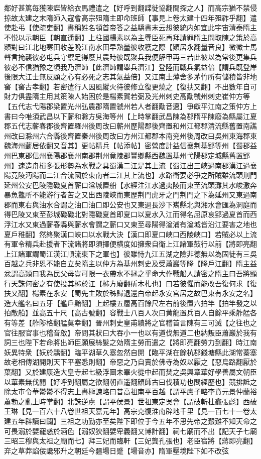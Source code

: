 鄰好甚篤每獲陳諜皆給衣馬禮遣之【好呼到翻諜徙協翻間探之人】而高宗猶不禁侵掠故太建之末隋師入寇會高宗殂隋主即命班師【事見上卷太建十四年殂祚乎翻】遣使赴弔【使疏吏翻】書稱姓名頓首帝答之益驕書末云想彼統内如宜此宇宙清泰隋主不悦以示朝臣【朝直遥翻】上柱國楊素以為主辱臣死再拜請罪隋主問取陳之策於高熲對曰江北地寒田收差晩江南水田早熟量彼收穫之際【熲居永翻量音良】微徵士馬聲言掩襲彼必屯兵守禦足得廢其農時彼既聚兵我便解甲再三若此彼以為常後更集兵彼必不信猶豫之頃我乃濟師【此濟師謂舉兵濟江】登陸而戰兵氣益倍【謂兵既登岸後限大江士無反顧之心有必死之志其氣益倍】又江南土薄舍多茅竹所有儲積皆非地窖【窖古孝翻】若密遣行人因風縱火待彼修立復更燒之【復扶又翻】不出數年自可財力俱盡隋主用其策陳人始困於是楊素賀若弼及光州刺史高勱虢州刺史崔仲方等【五代志弋陽郡梁置光州弘農郡隋置虢州若人者翻勱音邁】爭獻平江南之策仲方上書曰今唯須武昌以下蘄和滁方吳海等州【上時掌翻武昌陳為郡隋平陳廢為縣屬江夏郡五代志蘄春郡後齊置羅州後周改曰蘄州歷陽郡後齊置和州江都郡清流縣舊置南譙州改曰滁州六合縣後齊置秦州後周改曰方州江都郡本南兖州後周改曰吳州東海郡東魏海州蘄居依翻又音其】更帖精兵【帖添帖】密營度計益信襄荆基郢等州【蜀郡益州巴東郡信州襄陽郡襄州南郡荆州竟陵郡豐鄉縣西魏置基州弋陽郡定城縣舊置郢州】速造舟楫多張形勢為水戰之具蜀漢二江是其上流【蜀江出三峽過南郡漢江過襄陽竟陵沔陽而二江合流國於東南者二江其上流也】水路衝要必爭之所賊雖流頭荆門延州公安巴陵隱磯夏首蘄口湓城置船【水經注江水過夷陵而東至流頭灘其水峻激奔暴魚龞所不能游行者苦之又出西陵峽而東歷荆門虎牙之門荆門之下為延州又東過南郡而東右與油水合謂之油口油口即公安也又東過長沙下嶲縣北與湘水會匯為洞庭而得巴陵又東至彭城磯磯北對隱磯夏首即夏口以夏水入江而得名屈原哀郢過夏首而西浮江水又東過蘄春縣與蘄水會謂之蘄口又東至尋陽得湓浦有湓城皆沿江要害之地也夏戶稚翻】然終聚漢口峽口以水戰大決【漢口即夏口峽口西陵峽口】若賊必以上流有軍令精兵赴援者下流諸將即須擇便横度如擁衆自衛上江諸軍鼓行以前【將即亮翻上江諸軍謂蜀江漢江順流東下之軍也】彼雖恃九江五湖之險非德無以為固徒有三吳百越之兵非恩不能自立矣隋主以仲方為基州刺史及受蕭巖等降【降戶江翻】隋主益忿謂高熲曰我為民父母豈可限一衣帶水不拯之乎命大作戰船人請密之隋主曰吾將顯行天誅何密之有使投其柹於江【柹方廢翻斫木札也】曰若彼懼而能改吾復何求【復扶又翻】楊素在永安【蜀先主敗於秭歸退還白帝起永安宫居之故巴東有永安之名】造大艦名曰五牙【艦戶黯翻】上起樓五層高百餘尺左右前後置六拍竿【拍竿發之以拍敵船】並高五十尺【高古號翻】容戰士八百人次曰黄龍置兵百人自餘平乘舴艋各有等差【舴陟格翻艋莫幸翻】晉州刺史皇甫續將之官稽首言陳有三可滅【之往也之官往服官事也稽音啟】帝問其狀曰大吞小一也以有道伐無道二也納叛臣蕭巖於我有詞三也陛下若命將出師臣願展絲髮之効隋主勞而遣之【將即亮翻勞力到翻】時江南妖異特衆【妖於驕翻】臨平湖草久塞忽然自開【臨平湖在餘杭郡錢塘縣此湖常蓁塞故老相傳湖開則天下平塞悉則翻】帝惡之乃自賣於佛寺為奴以厭之【惡烏路翻厭於葉翻】又於建康造大皇寺起七級浮圖未畢火從中起而焚之吳興章華好學善屬文朝臣以華素無伐閱【好呼到翻屬之欲翻朝直遥翻顔師古曰伐積功也閲經歷也】競排詆之除太市令華鬱鬱不得志上書極諫略曰昔高祖南平百越【謂平盧子略李賁元景仲蘭裕蕭勃之亂上時掌翻】北誅逆虜【謂平侯景】世祖東定吳會【謂破斬杜龕張彪】西破王琳【見一百六十八卷世祖天嘉元年】高宗克復淮南辟地千里【見一百七十一卷太建五年辟讀曰闢】三祖之功勤亦至矣陛下即位于今五年不思先帝之艱難不知天命之可畏溺於嬖寵惑於酒色【溺奴狄翻嬖卑義翻又博計翻】祠七廟而不出【記天子七廟三昭三穆與太祖之廟而七】拜三妃而臨軒【三妃龔孔張也】老臣宿將【蔣即亮翻】弃之草莽諂佞讒邪升之朝廷今疆場日蹙【場音亦】隋軍壓境陛下如不改弦